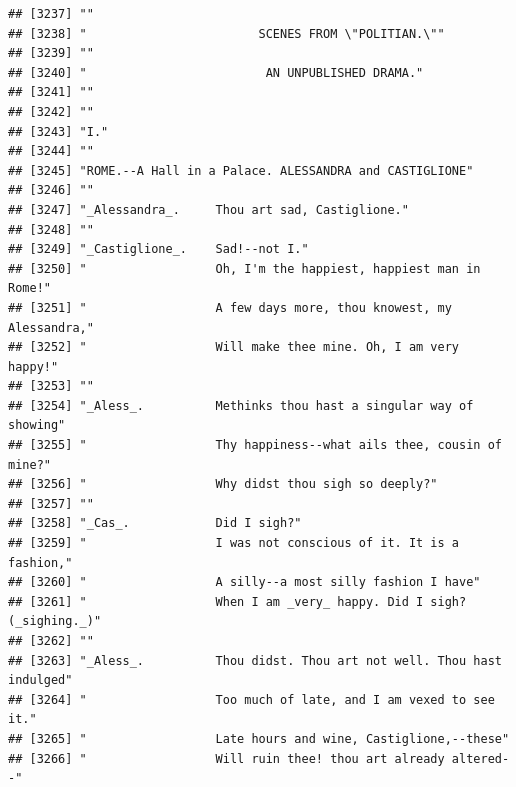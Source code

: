 \documentclass{article}\usepackage[]{graphicx}\usepackage[]{color}
\makeatletter
\newenvironment{kframe}{%
 \def\at@end@of@kframe{}%
 \ifinner\ifhmode%
  \def\at@end@of@kframe{\end{minipage}}%
  \begin{minipage}{\columnwidth}%
 \fi\fi%
 \def\FrameCommand##1{\hskip\@totalleftmargin \hskip-\fboxsep
 \colorbox{shadecolor}{##1}\hskip-\fboxsep
     \hskip-\linewidth \hskip-\@totalleftmargin \hskip\columnwidth}%
 \MakeFramed {\advance\hsize-\width
   \@totalleftmargin\z@ \linewidth\hsize
   \@setminipage}}%
 {\par\unskip\endMakeFramed%
 \at@end@of@kframe}
\newenvironment{knitrout}{}{} %
\makeatother
\begin{document}
\begin{knitrout}
\begin{kframe}
\begin{verbatim}
## [3237] ""                                                                            
## [3238] "                        SCENES FROM \"POLITIAN.\""                           
## [3239] ""                                                                            
## [3240] "                         AN UNPUBLISHED DRAMA."                              
## [3241] ""                                                                            
## [3242] ""                                                                            
## [3243] "I."                                                                          
## [3244] ""                                                                            
## [3245] "ROME.--A Hall in a Palace. ALESSANDRA and CASTIGLIONE"                       
## [3246] ""                                                                            
## [3247] "_Alessandra_.     Thou art sad, Castiglione."                                
## [3248] ""                                                                            
## [3249] "_Castiglione_.    Sad!--not I."                                              
## [3250] "                  Oh, I'm the happiest, happiest man in Rome!"               
## [3251] "                  A few days more, thou knowest, my Alessandra,"             
## [3252] "                  Will make thee mine. Oh, I am very happy!"                 
## [3253] ""                                                                            
## [3254] "_Aless_.          Methinks thou hast a singular way of showing"              
## [3255] "                  Thy happiness--what ails thee, cousin of mine?"            
## [3256] "                  Why didst thou sigh so deeply?"                            
## [3257] ""                                                                            
## [3258] "_Cas_.            Did I sigh?"                                               
## [3259] "                  I was not conscious of it. It is a fashion,"               
## [3260] "                  A silly--a most silly fashion I have"                      
## [3261] "                  When I am _very_ happy. Did I sigh? (_sighing._)"          
## [3262] ""                                                                            
## [3263] "_Aless_.          Thou didst. Thou art not well. Thou hast indulged"         
## [3264] "                  Too much of late, and I am vexed to see it."               
## [3265] "                  Late hours and wine, Castiglione,--these"                  
## [3266] "                  Will ruin thee! thou art already altered--"                

\end{verbatim}
\end{kframe}
\end{knitrout}
\end{document}
